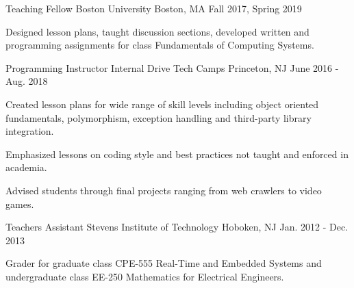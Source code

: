 



\begin{cventries}
  \cventry
    {Teaching Fellow} %
    {Boston University} %
    {Boston, MA} %
    {Fall 2017, Spring 2019} %
    {
      \begin{cvitems} %
\item {Designed lesson plans, taught discussion sections, developed written and programming assignments for class
Fundamentals of Computing Systems.}
      \end{cvitems}
    }

  \cventry
    {Programming Instructor} %
    {Internal Drive Tech Camps} %
    {Princeton, NJ} %
    {June 2016 - Aug. 2018} %
    {
      \begin{cvitems} %
      \item {Created lesson plans for wide range of skill levels including object oriented fundamentals, polymorphism, exception handling and third-party library integration.}
\item {Emphasized lessons on coding style and best practices not taught and enforced in academia.}
\item{Advised students through final projects ranging from web crawlers to video games.}
      \end{cvitems}
    }

  \cventry
    {Teachers Assistant} %
    {Stevens Institute of Technology} %
    {Hoboken, NJ} %
    {Jan. 2012 - Dec. 2013} %
    {
      \begin{cvitems} %
\item {Grader for graduate class CPE-555 Real-Time and Embedded Systems and
undergraduate class EE-250 Mathematics for Electrical Engineers.}
      \end{cvitems}
    }

\end{cventries}
